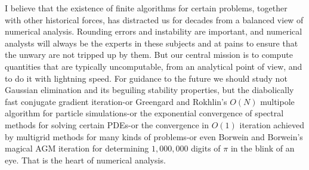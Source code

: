 I believe that the existence of finite algorithms for certain problems, together with other historical forces, has distracted us for decades from a balanced view of numerical analysis. Rounding errors and instability are important, and numerical analysts will always be the experts in these subjects and at pains to ensure that the unwary are not tripped up by them. But our central mission is to compute quantities that are typically uncomputable, from an analytical point of view, and to do it with lightning speed. For guidance to the future we should study not Gaussian elimination and its beguiling stability properties, but the diabolically fast conjugate gradient iteration-or Greengard and Rokhlin's $O(N)$ multipole algorithm for particle simulations-or the exponential convergence of spectral methods for solving certain PDEs-or the convergence in $O(1)$ iteration achieved by multigrid methods for many kinds of problems-or even Borwein and Borwein's magical AGM iteration for determining $1,000,000$ digits of $\pi$ in the blink of an eye. That is the heart of numerical analysis.